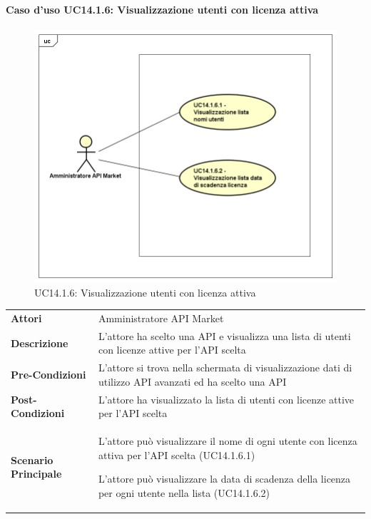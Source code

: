 \newpage
\paragraph{Caso d'uso UC14.1.6: Visualizzazione utenti con licenza attiva}
\label{UC14_1_6}
\begin{figure}[ht]
	\centering
	\includegraphics[scale=0.45]{UML/UC14_1_6.png}
	\caption{UC14.1.6: Visualizzazione utenti con licenza attiva}
\end{figure}

\begin{minipage}{\linewidth}
	\begin{tabular}{ l | p{11cm}}
		\hline
		\rowcolor{Gray}
		\multicolumn{2}{c}{UC14.1.6 - Visualizzazione utenti con licenza attiva} \\
		\hline
		\textbf{Attori} & Amministratore API Market \\
		\textbf{Descrizione} & L'attore ha scelto una API e visualizza una lista di utenti con licenze attive per l'API scelta\\
		\textbf{Pre-Condizioni} & L'attore si trova nella schermata di visualizzazione dati di utilizzo API avanzati ed ha scelto una API \\
		\textbf{Post-Condizioni} & L'attore ha visualizzato la lista di utenti con licenze attive per l'API scelta \\
		\textbf{Scenario Principale} & 
		\begin{enumerate*}[label=(\arabic*.),itemjoin={\newline}]
			\item L'attore può visualizzare il nome di ogni utente con licenza attiva per l'API scelta (UC14.1.6.1)
			\item L'attore può visualizzare la data di scadenza della licenza per ogni utente nella lista (UC14.1.6.2)
		\end{enumerate*}\\
	\end{tabular}
\end{minipage}

